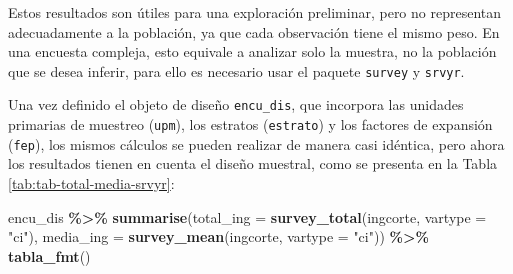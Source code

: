 \documentclass[
  spanish,
  12pt,
]{book}
\newenvironment{Shaded}{\begin{snugshade}}{\end{snugshade}}
\newcommand{\AttributeTok}[1]{\textcolor[rgb]{0.13,0.29,0.53}{#1}}
\newcommand{\FunctionTok}[1]{\textcolor[rgb]{0.13,0.29,0.53}{\textbf{#1}}}
\newcommand{\NormalTok}[1]{#1}
\newcommand{\SpecialCharTok}[1]{\textcolor[rgb]{0.81,0.36,0.00}{\textbf{#1}}}
\newcommand{\StringTok}[1]{\textcolor[rgb]{0.31,0.60,0.02}{#1}}
\begin{document}
Estos resultados son útiles para una exploración preliminar, pero no representan adecuadamente a la población, ya que cada observación tiene el mismo peso. En una encuesta compleja, esto equivale a analizar solo la muestra, no la población que se desea inferir, para ello es necesario usar el paquete \texttt{survey} y \texttt{srvyr}.

Una vez definido el objeto de diseño \texttt{encu\_dis}, que incorpora las unidades primarias de muestreo (\texttt{upm}), los estratos (\texttt{estrato}) y los factores de expansión (\texttt{fep}), los mismos cálculos se pueden realizar de manera casi idéntica, pero ahora los resultados tienen en cuenta el diseño muestral, como se presenta en la Tabla \ref{tab:tab-total-media-srvyr}:

\begin{Shaded}
\begin{Highlighting}[]
\NormalTok{encu\_dis }\SpecialCharTok{\%\textgreater{}\%}
  \FunctionTok{summarise}\NormalTok{(}\AttributeTok{total\_ing =} \FunctionTok{survey\_total}\NormalTok{(ingcorte, }\AttributeTok{vartype =} \StringTok{"ci"}\NormalTok{),}
            \AttributeTok{media\_ing =} \FunctionTok{survey\_mean}\NormalTok{(ingcorte, }\AttributeTok{vartype =} \StringTok{"ci"}\NormalTok{)) }\SpecialCharTok{\%\textgreater{}\%}
  \FunctionTok{tabla\_fmt}\NormalTok{()}
\end{Highlighting}
\end{Shaded}
\end{document}
